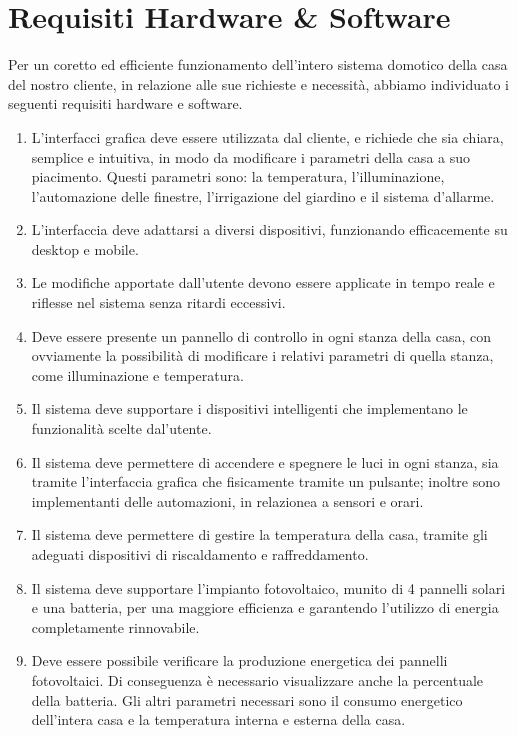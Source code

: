 \documentclass[italian, 12pt, a4paper]{article}
\begin{document}
\clearpage
\section{Requisiti Hardware \& Software}\label{sec:requisiti}
Per un coretto ed efficiente funzionamento dell'intero sistema domotico della casa del nostro cliente, in relazione alle sue richieste e necessità, abbiamo individuato i seguenti requisiti hardware e software.
\begin{enumerate}
    \item L'interfacci grafica deve essere utilizzata dal cliente, e richiede che sia chiara, semplice e intuitiva, in modo da modificare i parametri della casa a suo piacimento. Questi parametri sono: la temperatura, l'illuminazione, l'automazione delle finestre, l'irrigazione del giardino e il sistema d'allarme.
    \item L’interfaccia deve adattarsi a diversi dispositivi, funzionando efficacemente su desktop e mobile.
    \item Le modifiche apportate dall’utente devono essere applicate in tempo reale e riflesse nel sistema senza ritardi eccessivi.
    \item Deve essere presente un pannello di controllo in ogni stanza della casa, con ovviamente la possibilità di modificare i relativi parametri di quella stanza, come illuminazione e temperatura.
    \item Il sistema deve supportare i dispositivi intelligenti che implementano le funzionalità scelte dal'utente.
    \item Il sistema deve permettere di accendere e spegnere le luci in ogni stanza, sia tramite l'interfaccia grafica che fisicamente tramite un pulsante; inoltre sono implementanti delle automazioni, in relazionea a sensori e orari.
    \item Il sistema deve permettere di gestire la temperatura della casa, tramite gli adeguati dispositivi di riscaldamento e raffreddamento.
    \item Il sistema deve supportare l'impianto fotovoltaico, munito di 4 pannelli solari e una batteria, per una maggiore efficienza e garantendo l’utilizzo di energia completamente rinnovabile.
    \item Deve essere possibile verificare la produzione energetica dei pannelli fotovoltaici. Di conseguenza è necessario visualizzare anche la percentuale della batteria. Gli altri parametri necessari sono il consumo energetico dell’intera casa e la temperatura interna e esterna della casa.
\end{enumerate}
\clearpage
\clearpage
\end{document}
